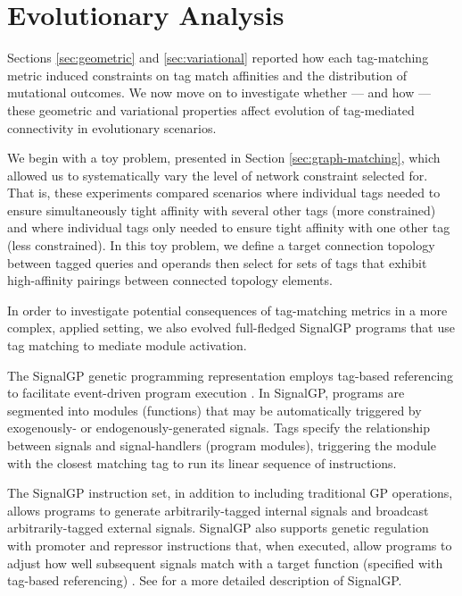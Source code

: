 \section{Evolutionary Analysis} \label{sec:evolutionary}

Sections \ref{sec:geometric} and \ref{sec:variational} reported how each tag-matching metric induced constraints on tag match affinities and the distribution of mutational outcomes.
We now move on to investigate whether --- and how --- these geometric and variational properties affect evolution of tag-mediated connectivity in evolutionary scenarios.

We begin with a toy problem, presented in Section \ref{sec:graph-matching}, which allowed us to systematically vary the level of network constraint selected for.
That is, these experiments compared scenarios where individual tags needed to ensure simultaneously tight affinity with several other tags (more constrained) and where individual tags only needed to ensure tight affinity with one other tag (less constrained).
In this toy problem, we define a target connection topology between tagged queries and operands then select for sets of tags that exhibit high-affinity pairings between connected topology elements.

In order to investigate potential consequences of tag-matching metrics in a more complex, applied setting, we also evolved full-fledged SignalGP programs that use tag matching to mediate module activation.

The SignalGP genetic programming representation employs tag-based referencing to facilitate event-driven program execution \citep{lalejini2018evolving}.
In SignalGP, programs are segmented into modules (functions) that may be automatically triggered by exogenously- or endogenously-generated signals.
Tags specify the relationship between signals and signal-handlers (program modules), triggering the module with the closest matching tag to run its linear sequence of instructions.

The SignalGP instruction set, in addition to including traditional GP operations, allows programs to generate arbitrarily-tagged internal signals and broadcast arbitrarily-tagged external signals.
SignalGP also supports genetic regulation with promoter and repressor instructions that, when executed, allow programs to adjust how well subsequent signals match with a target function (specified with tag-based referencing) \citep{lalejini2021tag}.
See \cite{lalejini2018evolving} for a more detailed description of SignalGP.

